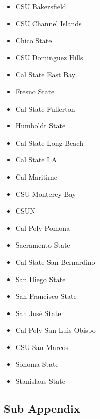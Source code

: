 \begin{itemize}
\item CSU Bakersfield
\item CSU Channel Islands
\item Chico State
\item CSU Dominguez Hills
\item Cal State East Bay
\item Fresno State
\item Cal State Fullerton
\item Humboldt State
\item Cal State Long Beach
\item Cal State LA
\item Cal Maritime
\item CSU Monterey Bay
\item CSUN
\item Cal Poly Pomona
\item Sacramento State
\item Cal State San Bernardino
\item San Diego State
\item San Francisco State
\item San José State
\item Cal Poly San Luis Obispo
\item CSU San Marcos
\item Sonoma State
\item Stanislaus State
\end{itemize}

\begin{subappendices}
\subsection{Sub Appendix}
\end{subappendices}


